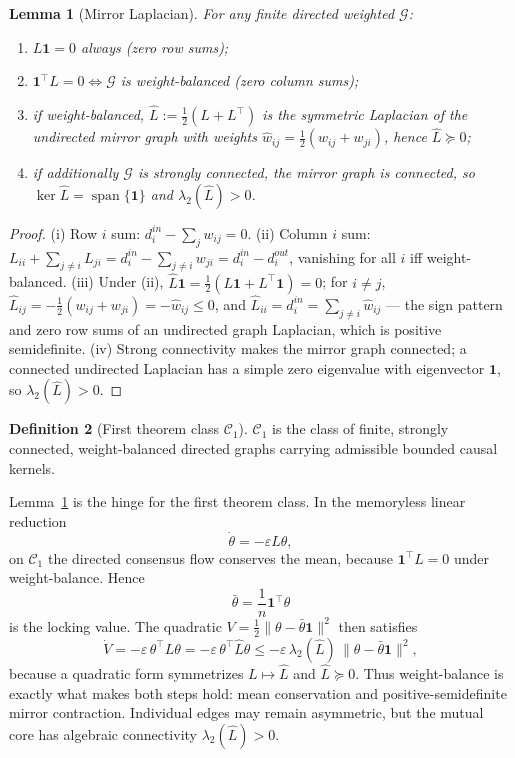 \documentclass[11pt,a4paper]{article}
\def\mathrm#1{#1}%
\theoremstyle{definition}
\newtheorem{definition}{Definition}[section]
\theoremstyle{plain}
\newtheorem{lemma}[definition]{Lemma}
\theoremstyle{remark}
\begin{document}
\begin{lemma}[Mirror Laplacian]\label{lem:mirror}
For any finite directed weighted $\mathcal G$:
\begin{enumerate}[label=\textup{(\roman*)},leftmargin=1.2cm]
\item $L\mathbf 1=0$ always (zero row sums);
\item $\mathbf 1^\top L=0\iff\mathcal G$ is weight-balanced (zero column sums);
\item if weight-balanced, $\hat L:=\tfrac12(L+L^\top)$ is the symmetric Laplacian of the undirected mirror graph with weights $\hat w_{ij}=\tfrac12(w_{ij}+w_{ji})$, hence $\hat L\succeq0$;
\item if additionally $\mathcal G$ is strongly connected, the mirror graph is connected, so $\ker\hat L=\operatorname{span}\{\mathbf 1\}$ and $\lambda_2(\hat L)>0$.
\end{enumerate}
\end{lemma}
\begin{proof}
(i) Row $i$ sum: $d_i^{\mathrm{in}}-\sum_j w_{ij}=0$. (ii) Column $i$ sum:
$L_{ii}+\sum_{j\ne i}L_{ji}=d_i^{\mathrm{in}}-\sum_{j\ne i}w_{ji}=d_i^{\mathrm{in}}-d_i^{\mathrm{out}}$,
vanishing for all $i$ iff weight-balanced. (iii) Under (ii),
$\hat L\mathbf 1=\tfrac12(L\mathbf 1+L^\top\mathbf 1)=0$; for $i\ne j$,
$\hat L_{ij}=-\tfrac12(w_{ij}+w_{ji})=-\hat w_{ij}\le0$, and
$\hat L_{ii}=d_i^{\mathrm{in}}=\sum_{j\ne i}\hat w_{ij}$ --- the sign pattern and zero
row sums of an undirected graph Laplacian, which is positive semidefinite. (iv)
Strong connectivity makes the mirror graph connected; a connected undirected
Laplacian has a simple zero eigenvalue with eigenvector $\mathbf 1$, so
$\lambda_2(\hat L)>0$. \qedhere
\end{proof}

\begin{definition}[First theorem class $\mathcal C_1$]
$\mathcal C_1$ is the class of finite, strongly connected, weight-balanced directed
graphs carrying admissible bounded causal kernels.
\end{definition}

Lemma~\ref{lem:mirror} is the hinge for the first theorem class. In the memoryless
linear reduction
\[
\dot\theta=-\varepsilon L\theta,
\]
on $\mathcal C_1$ the directed consensus flow conserves the mean, because
$\mathbf 1^\top L=0$ under weight-balance. Hence
\[
\bar\theta=\frac1n\mathbf 1^\top\theta
\]
is the locking value. The quadratic $V=\tfrac12\|\theta-\bar\theta\mathbf 1\|^2$ then
satisfies
\[
\dot V=-\varepsilon\,\theta^\top L\theta=-\varepsilon\,\theta^\top\hat L\theta
\le-\varepsilon\,\lambda_2(\hat L)\,\|\theta-\bar\theta\mathbf 1\|^2,
\]
because a quadratic form symmetrizes $L\mapsto\hat L$ and $\hat L\succeq0$. Thus
weight-balance is exactly what makes both steps hold: mean conservation and
positive-semidefinite mirror contraction. Individual edges may remain asymmetric,
but the mutual core has algebraic connectivity $\lambda_2(\hat L)>0$.
\end{document}
